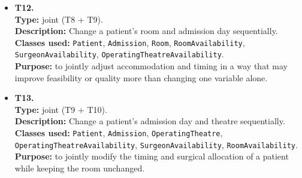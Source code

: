 \documentclass[10pt]{article}
\newcommand{\tlabel}[1]{{\large\bfseries #1}}
\begin{document}
\begin{itemize}
    \item \tlabel{T12.}\\
    \textbf{Type:} joint (T8 + T9).\\
    \textbf{Description:} Change a patient's room and admission day sequentially.\\
    \textbf{Classes used:} \texttt{Patient}, \texttt{Admission}, \texttt{Room}, \texttt{RoomAvailability}, \texttt{SurgeonAvailability}, \texttt{OperatingTheatreAvailability}.\\
    \textbf{Purpose:} to jointly adjust accommodation and timing in a way that may improve feasibility or quality more than changing one variable alone.
    
    \item \tlabel{T13.}\\
    \textbf{Type:} joint (T9 + T10).\\
    \textbf{Description:} Change a patient's admission day and theatre sequentially.\\
    \textbf{Classes used:} \texttt{Patient}, \texttt{Admission}, \texttt{OperatingTheatre}, \texttt{OperatingTheatreAvailability}, \texttt{SurgeonAvailability}, \texttt{RoomAvailability}.\\
    \textbf{Purpose:} to jointly modify the timing and surgical allocation of a patient while keeping the room unchanged.
\end{itemize}
\end{document}
